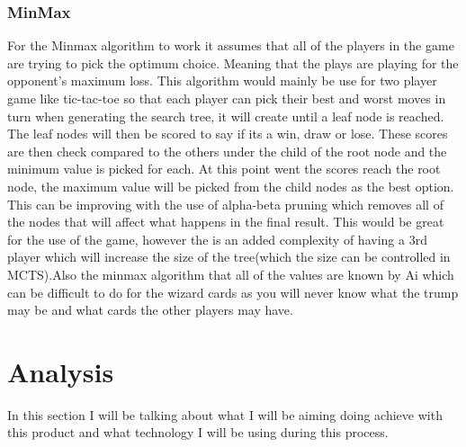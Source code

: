 \subsubsection{MinMax}
For the Minmax algorithm to work it assumes that all of the players in the game are trying to pick the optimum choice. Meaning that the plays are playing for the opponent’s maximum loss. This algorithm would mainly be use for two player game like tic-tac-toe so that each player can pick their best and worst moves in turn when generating the search tree, it will create until a leaf node is reached. \cite{minmax} The leaf nodes will then be scored to say if its a win, draw or lose. These scores are then check compared to the others under the child of the root node and the minimum value is picked for each. At this point went the scores reach the root node, the maximum value will be picked from the child nodes as the best option. This can be improving with the use of alpha-beta pruning which removes all of the nodes that will affect what happens in the final result. This would be great for the use of the game, however the is an added complexity of having a 3rd player which will increase the size of the tree(which the size can be controlled in MCTS).Also the minmax algorithm that all of the values are known by Ai which can be difficult to do for the wizard cards as you will never know what the trump may be and what cards the other players may have.

\section{Analysis}
In this section I will be talking about what I will be aiming doing achieve with this product and what technology I will be using during this process. 
